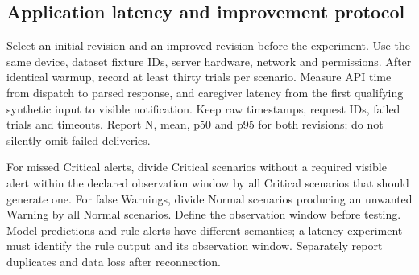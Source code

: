 \subsection{Application latency and improvement protocol}
Select an initial revision and an improved revision before the experiment. Use the same device, dataset fixture IDs, server hardware, network and permissions. After identical warmup, record at least thirty trials per scenario. Measure API time from dispatch to parsed response, and caregiver latency from the first qualifying synthetic input to visible notification. Keep raw timestamps, request IDs, failed trials and timeouts. Report N, mean, p50 and p95 for both revisions; do not silently omit failed deliveries.

For missed Critical alerts, divide Critical scenarios without a required visible alert within the declared observation window by all Critical scenarios that should generate one. For false Warnings, divide Normal scenarios producing an unwanted Warning by all Normal scenarios. Define the observation window before testing. Model predictions and rule alerts have different semantics; a latency experiment must identify the rule output and its observation window. Separately report duplicates and data loss after reconnection.

